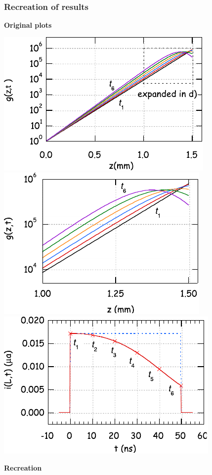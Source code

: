 \documentclass{beamer}
\begin{document}
    \begin{frame}
        \frametitle{Recreation of results}
        \begin{minipage}{0.4\linewidth}
            \centering
            \textbf{Original plots}

            \includegraphics[scale=0.55]{"tlm-gain-orig.pdf"}
            \includegraphics[scale=0.55]{"tlm-gain-zoom-orig.pdf"}
            \includegraphics[scale=0.55]{"tlm-output-orig.pdf"}
        \end{minipage}
        \hspace{40pt}
        \begin{minipage}{0.4\linewidth}
            \centering
            \textbf{Recreation}


\end{minipage}
\end{frame}
\end{document}
